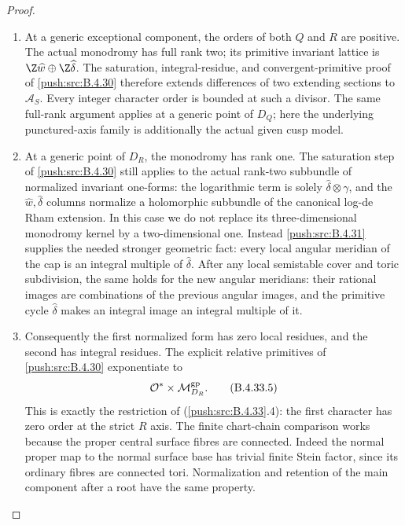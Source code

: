 \begin{proof}
\begin{enumerate}[label=\arabic*.,leftmargin=*]
\item At a generic exceptional component, the
orders of both $Q$ and $R$ are positive.
The actual monodromy has full rank two;
its primitive invariant lattice is
$\Z\widehat w\oplus\Z\widehat\delta$.
The saturation, integral-residue, and
convergent-primitive proof of \ref{push:src:B.4.30}
therefore extends differences of two
extending sections to $\mathcal A_S$.
Every integer character order is bounded
at such a divisor. The same full-rank
argument applies at a generic point of
$D_Q$; here the underlying punctured-axis
family is additionally the actual given
cusp model.

\item At a generic point of $D_R$, the monodromy
has rank one. The saturation step of
\ref{push:src:B.4.30} still applies to the actual
rank-two subbundle of normalized invariant
one-forms:
the logarithmic term is solely
$\widehat\delta\otimes\gamma$, and the
$\widehat w,\widehat\delta$ columns
normalize a holomorphic subbundle of the
canonical log-de Rham extension. In this
case we do not replace its three-dimensional
monodromy kernel by a two-dimensional one.
Instead \ref{push:src:B.4.31} supplies the needed stronger
geometric fact: every local angular
meridian of the cap is an integral multiple
of $\widehat\delta$. After any local
semistable cover and toric subdivision,
the same holds for the new angular
meridians: their rational images are
combinations of the previous angular
images, and the primitive cycle
$\widehat\delta$ makes an integral image
an integral multiple of it.

\item Consequently the first normalized form
has zero local residues, and the second
has integral residues. The explicit
relative primitives of \ref{push:src:B.4.30} exponentiate
to
\[
             \mathcal O^*\times
                    \mathcal M_{D_R}^{\rm gp}.
 \tag{B.4.33.5}
\]
This is exactly the restriction of
(\ref{push:src:B.4.33}.4): the first character has zero
order at the strict $R$ axis. The finite
chart-chain comparison works because the
proper central surface fibres are
connected. Indeed the normal proper map
to the normal surface base has trivial
finite Stein factor, since its ordinary
fibres are connected tori. Normalization
and retention of the main component after
a root have the same property.


\end{enumerate}
\end{proof}
